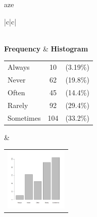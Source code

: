  aze 
  \begin{center}
    \addtolength{\leftskip}{-4cm}\addtolength{\rightskip}{-4cm}
    \begin{tabular}{|c|c|}

      \hline
        \\
      \hline
        {\bf Frequency} & {\bf Histogram}  \\
          \begin{tabular}{@{}l@{ : }cl@{}}
            Always & 10 &(3.19\%) \\
            Never & 62 &(19.8\%) \\
            Often & 45 &(14.4\%) \\
            Rarely & 92 &(29.4\%) \\
            Sometimes & 104 &(33.2\%) \\
          \end{tabular}
      &
          \begin{tabular}{@{}l@{}}
            \includegraphics[width=3cm]{graphUniv/V8-barplot}
          \end{tabular}
      \\ \hline 

    \end{tabular}
  \end{center}
  
  



